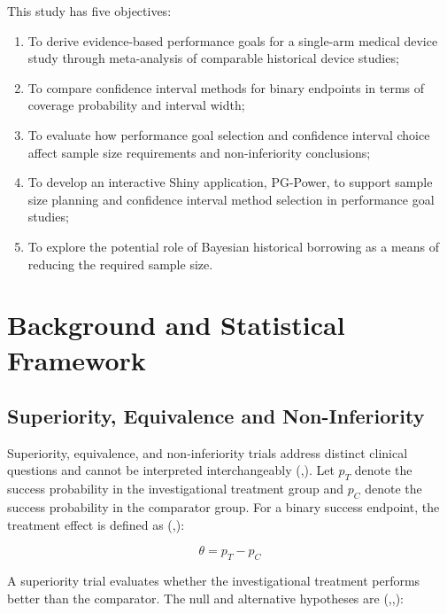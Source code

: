 \documentclass{article}
\providecommand{\tightlist}{%
  \setlength{\itemsep}{0pt}\setlength{\parskip}{0pt}}
\begin{document}
This study has five objectives:

\begin{enumerate}
\def\labelenumi{\arabic{enumi}.}
\tightlist
\item
  To derive evidence-based performance goals for a single-arm medical
  device study through meta-analysis of comparable historical device
  studies;
\item
  To compare confidence interval methods for binary endpoints in terms
  of coverage probability and interval width;
\item
  To evaluate how performance goal selection and confidence interval
  choice affect sample size requirements and non-inferiority
  conclusions;
\item
  To develop an interactive Shiny application, PG-Power, to support
  sample size planning and confidence interval method selection in
  performance goal studies;
\item
  To explore the potential role of Bayesian historical borrowing as a
  means of reducing the required sample size.
\end{enumerate}

\section{Background and Statistical
Framework}\label{background-and-statistical-framework}

\subsection{Superiority, Equivalence and
Non-Inferiority}\label{superiority-equivalence-and-non-inferiority}

Superiority, equivalence, and non-inferiority trials address distinct
clinical questions and cannot be interpreted interchangeably
(,).
Let \(p_T\) denote the success probability in the investigational
treatment group and \(p_C\) denote the success probability in the
comparator group. For a binary success endpoint, the treatment effect is
defined as
(,):

\[\theta = p_T - p_C\]

A superiority trial evaluates whether the investigational treatment
performs better than the comparator. The null and alternative hypotheses
are
(,,):
\end{document}
